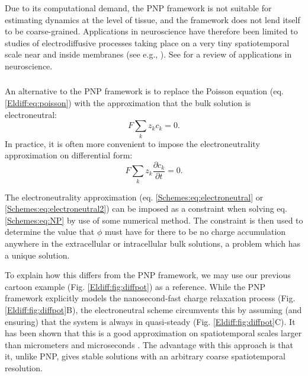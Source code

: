 Due to its computational demand, the PNP framework is not suitable for estimating dynamics at the level of tissue, and the framework does not lend itself to be coarse-grained. Applications in neuroscience have therefore been limited to studies of electrodiffusive processes taking place on a very tiny spatiotemporal scale near and inside membranes (see e.g., \citep{Leonetti2004, Lu2007, Lopreore2008, Nanninga2008, Gardner2011, Zheng2011, Pods2013, Gardner2015}). See \citep{Savtchenko2017} for a review of applications in neuroscience.


\subsubsection{}
\label{sec:Schemes:electroneutral}
An alternative to the PNP framework is to replace the Poisson equation (eq. \ref{Eldiff:eq:poisson}) with the approximation that the bulk solution is electroneutral:
\begin{equation}
F \sum_k z_k c_k = 0.
\label{Schemes:eq:electroneutral}
\end{equation}
In practice, it is often more convenient to impose the electroneutrality approximation on differential form:
\begin{equation}
F \sum_k{z_k \frac{\partial c_k}{\partial t}} = 0.
\label{Schemes:eq:electroneutral2}
\end{equation}

The electroneutrality approximation (eq. \ref{Schemes:eq:electroneutral} or \ref{Schemes:eq:electroneutral2}) can be imposed as a constraint when solving eq.\ref{Schemes:eq:NP} by use of some numerical method. The constraint is then used to determine the value that $\phi$ must have for there to be no charge accumulation anywhere in the extracellular or intracellular bulk solutions, a problem which has a unique solution. 

To explain how this differs from the PNP framework, we may use our previous cartoon example (Fig. \ref{Eldiff:fig:diffpot}) as a reference. While the PNP framework explicitly models the nanosecond-fast charge relaxation process (Fig. \ref{Eldiff:fig:diffpot}B), the electroneutral scheme circumvents this by assuming (and ensuring) that the system is always in quasi-steady (Fig. \ref{Eldiff:fig:diffpot}C). It has been shown that this is a good approximation on spatiotemporal scales larger than micrometers and microseconds \citep{Grodzinsky2011, Pods2017, Solbra2018}. The advantage with this approach is that it, unlike PNP, gives stable solutions with an arbitrary coarse spatiotemporal resolution.

